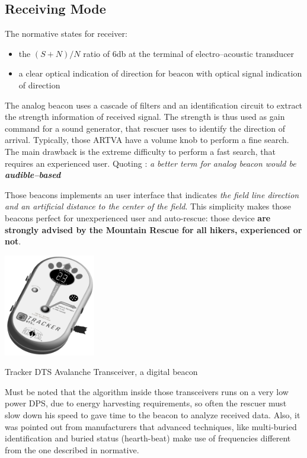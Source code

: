 \subsection{Receiving Mode}

The normative states for receiver:
\begin{itemize}
	\item the $(S+N)/N$ ratio of \num{6}\si{\decibel} at the terminal of electro--acoustic transducer
	\item a clear optical indication of direction for beacon with optical signal indication of direction
\end{itemize}

The analog beacon uses a cascade of filters and an identification circuit to extract the strength information of received signal. The strength is thus used as gain command for a sound generator, that rescuer uses to identify the direction of arrival. Typically, those ARTVA have a volume knob to perform a fine search. The main drawback is the extreme difficulty to perform a fast search, that requires an experienced user. Quoting \citep{457andfuture}: \emph{a better term for analog beacon would be \textbf{audible--based}}

Those beacons implements an user interface that indicates \emph{the field line direction and an artificial distance to the center of the field}. This simplicity makes those beacons perfect for unexperienced user and auto-rescue: those device \textbf{are strongly advised by the Mountain Rescue for all hikers, experienced or not}.

\begin{marginfigure}
	\centering
	\includegraphics[width=4cm]{ch1/img/digital_baecon}
	\caption{Tracker DTS Avalanche Transceiver, a digital beacon}
\end{marginfigure}

Must be noted that the algorithm inside those transceivers runs on a very low power DPS, due to energy harvesting requirements, so often the rescuer must slow down his speed to gave time to the beacon to analyze received data. Also, it was pointed out from manufacturers that advanced techniques, like multi-buried identification and buried status (hearth-beat) make use of frequencies different from the one described in normative.

